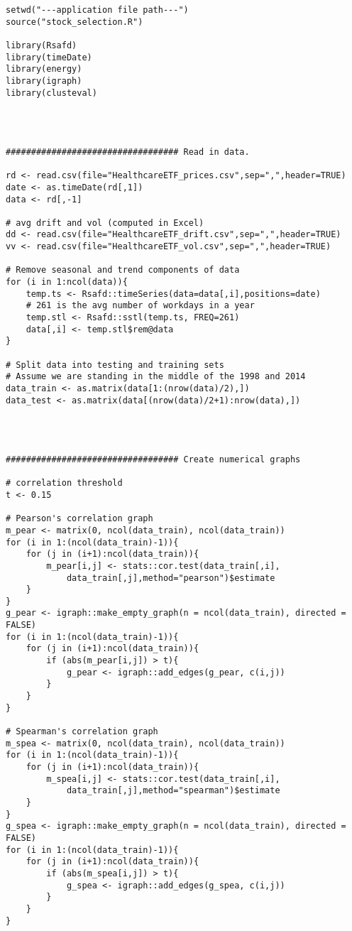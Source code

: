 {
\begin{lstlisting}
setwd("---application file path---")
source("stock_selection.R")

library(Rsafd)
library(timeDate)
library(energy)
library(igraph)
library(clusteval)




################################## Read in data.

rd <- read.csv(file="HealthcareETF_prices.csv",sep=",",header=TRUE)
date <- as.timeDate(rd[,1])
data <- rd[,-1]

# avg drift and vol (computed in Excel)
dd <- read.csv(file="HealthcareETF_drift.csv",sep=",",header=TRUE)
vv <- read.csv(file="HealthcareETF_vol.csv",sep=",",header=TRUE)

# Remove seasonal and trend components of data
for (i in 1:ncol(data)){
	temp.ts <- Rsafd::timeSeries(data=data[,i],positions=date)
	# 261 is the avg number of workdays in a year
	temp.stl <- Rsafd::sstl(temp.ts, FREQ=261) 
	data[,i] <- temp.stl$rem@data
}

# Split data into testing and training sets
# Assume we are standing in the middle of the 1998 and 2014
data_train <- as.matrix(data[1:(nrow(data)/2),])
data_test <- as.matrix(data[(nrow(data)/2+1):nrow(data),])




################################## Create numerical graphs

# correlation threshold
t <- 0.15

# Pearson's correlation graph
m_pear <- matrix(0, ncol(data_train), ncol(data_train))
for (i in 1:(ncol(data_train)-1)){
	for (j in (i+1):ncol(data_train)){
		m_pear[i,j] <- stats::cor.test(data_train[,i],
			data_train[,j],method="pearson")$estimate
	}
}
g_pear <- igraph::make_empty_graph(n = ncol(data_train), directed = FALSE)
for (i in 1:(ncol(data_train)-1)){
	for (j in (i+1):ncol(data_train)){
		if (abs(m_pear[i,j]) > t){
			g_pear <- igraph::add_edges(g_pear, c(i,j))
		}
	}
}

# Spearman's correlation graph
m_spea <- matrix(0, ncol(data_train), ncol(data_train))
for (i in 1:(ncol(data_train)-1)){
	for (j in (i+1):ncol(data_train)){
		m_spea[i,j] <- stats::cor.test(data_train[,i],
			data_train[,j],method="spearman")$estimate
	}
}
g_spea <- igraph::make_empty_graph(n = ncol(data_train), directed = FALSE)
for (i in 1:(ncol(data_train)-1)){
	for (j in (i+1):ncol(data_train)){
		if (abs(m_spea[i,j]) > t){
			g_spea <- igraph::add_edges(g_spea, c(i,j))
		}
	}
}


\end{lstlisting}}
